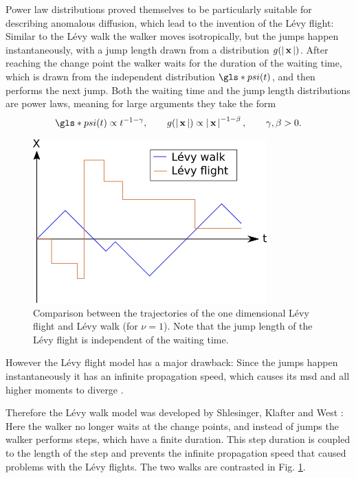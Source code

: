 Power law distributions proved themselves to be particularly suitable for describing anomalous diffusion, which lead to the invention of the L\'evy flight: Similar to the L\'evy walk the walker moves isotropically, but the jumps happen instantaneously, with a jump length drawn from a distribution $g(\left|\,\mathbf{ x }\,\right|)$. After reaching the change point the walker waits for the duration of the waiting time, which is drawn from the independent distribution $\gls*{psi}(t)$, and then performs the next jump. Both the waiting time and the jump length distributions are power laws, meaning for large arguments they take the form 
%
\begin{align}
\gls*{psi}(t) \propto t^{-1-\gamma}, \qquad g(\abs{\ve{x}}) \propto \abs{\ve{x}}^{-1-\beta}, \qquad \gamma, \beta > 0.
\end{align} 
%
\begin{figure}
\begin{center}
\includegraphics[width=90mm]{pics/levyFlight.png}
\caption{Comparison between the trajectories of the one dimensional L\'evy flight and L\'evy walk (for $\nu=1$). Note that the jump length of the L\'evy flight is independent of the waiting time.
\label{fig:levyFlight}}
\end{center}
\end{figure}
%
However the L\'evy flight model has a major drawback: Since the jumps happen instantaneously it has an infinite propagation speed, which causes its \gls*{msd} and all higher moments to diverge 
\cite{lwreview}. 

Therefore the L\'evy walk model was developed by Shlesinger, Klafter and West
\cite{shlesinger1987}:
Here the walker no longer waits at the change points, and instead of jumps the walker performs steps, which have a finite duration. This step duration is coupled to the length of the step and prevents the infinite propagation speed that caused problems with the L\'evy flights. The two walks are contrasted in Fig. \ref{fig:levyFlight}. 

